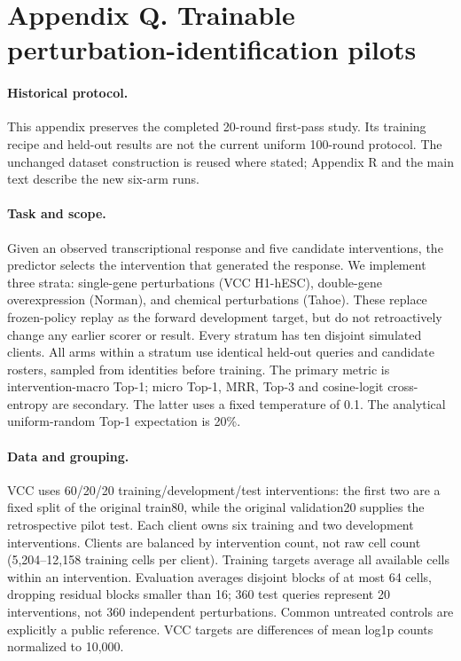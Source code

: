 \section*{Appendix Q. Trainable perturbation-identification pilots}
\label{sec:trainable-cell}
\paragraph{Historical protocol.} This appendix preserves the completed 20-round first-pass study. Its training recipe and held-out results are not the current uniform 100-round protocol. The unchanged dataset construction is reused where stated; Appendix R and the main text describe the new six-arm runs.
\setcounter{table}{0}
\renewcommand{\thetable}{Q.\arabic{table}}
\renewcommand{\theHtable}{Q.\arabic{table}}

\paragraph{Task and scope.}
Given an observed transcriptional response and five candidate interventions, the predictor selects the intervention that generated the response. We implement three strata: single-gene perturbations (VCC H1-hESC), double-gene overexpression (Norman), and chemical perturbations (Tahoe). These replace frozen-policy replay as the forward development target, but do not retroactively change any earlier scorer or result. Every stratum has ten disjoint simulated clients. All arms within a stratum use identical held-out queries and candidate rosters, sampled from identities before training. The primary metric is intervention-macro Top-1; micro Top-1, MRR, Top-3 and cosine-logit cross-entropy are secondary. The latter uses a fixed temperature of 0.1. The analytical uniform-random Top-1 expectation is 20\%.

\paragraph{Data and grouping.}
VCC uses 60/20/20 training/development/test interventions: the first two are a fixed split of the original train80, while the original validation20 supplies the retrospective pilot test. Each client owns six training and two development interventions. Clients are balanced by intervention count, not raw cell count (5,204--12,158 training cells per client). Training targets average all available cells within an intervention. Evaluation averages disjoint blocks of at most 64 cells, dropping residual blocks smaller than 16; 360 test queries represent 20 interventions, not 360 independent perturbations. Common untreated controls are explicitly a public reference. VCC targets are differences of mean log1p counts normalized to 10,000.

